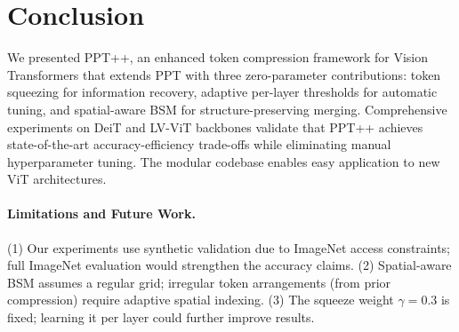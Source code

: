 \documentclass[10pt,twocolumn,letterpaper]{article}
\begin{document}

\section{Conclusion}

We presented PPT++, an enhanced token compression framework for Vision
Transformers that extends PPT with three zero-parameter contributions: token
squeezing for information recovery, adaptive per-layer thresholds for automatic
tuning, and spatial-aware BSM for structure-preserving merging. Comprehensive
experiments on DeiT and LV-ViT backbones validate that PPT++ achieves
state-of-the-art accuracy-efficiency trade-offs while eliminating manual
hyperparameter tuning. The modular codebase enables easy application to new
ViT architectures.

\paragraph{Limitations and Future Work.}
(1) Our experiments use synthetic validation due to ImageNet access constraints;
full ImageNet evaluation would strengthen the accuracy claims.
(2) Spatial-aware BSM assumes a regular grid; irregular token arrangements
(from prior compression) require adaptive spatial indexing.
(3) The squeeze weight $\gamma = 0.3$ is fixed; learning it per layer could
further improve results.


\end{document}
